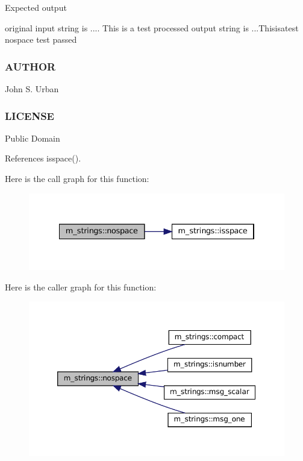 Expected output \begin{DoxyVerb}original input string is ....  This     is      a     test
processed output string is ...Thisisatest
nospace test passed
\end{DoxyVerb}
 \subsubsection*{A\+U\+T\+H\+OR}

John S. Urban \subsubsection*{L\+I\+C\+E\+N\+SE}

Public Domain 

References isspace().

Here is the call graph for this function\+:\nopagebreak
\begin{figure}[H]
\begin{center}
\leavevmode
\includegraphics[width=334pt]{namespacem__strings_ad007f050abe3d142f4a7badbc4408685_cgraph}
\end{center}
\end{figure}
Here is the caller graph for this function\+:\nopagebreak
\begin{figure}[H]
\begin{center}
\leavevmode
\includegraphics[width=350pt]{namespacem__strings_ad007f050abe3d142f4a7badbc4408685_icgraph}
\end{center}
\end{figure}
\mbox{\label{namespacem__strings_a3bf44ac06a670f55830e17a6f1108b9c}} 
